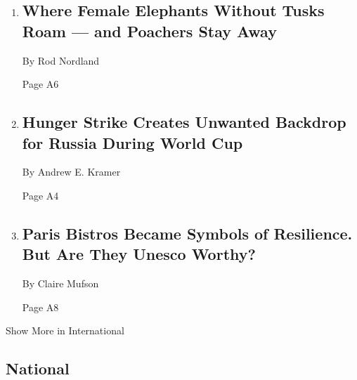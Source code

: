 \begin{enumerate}
\def\labelenumi{\arabic{enumi}.}
\item
  \href{/2018/06/16/world/africa/south-africa-elephants-tusks.html}{}

  \hypertarget{where-female-elephants-without-tusks-roam--and-poachers-stay-away-1}{%
  \subsection{Where Female Elephants Without Tusks Roam --- and Poachers
  Stay
  Away}\label{where-female-elephants-without-tusks-roam--and-poachers-stay-away-1}}

  By Rod Nordland

  Page A6
\item
  \href{/2018/06/16/world/europe/sentsov-russia-hunger-strike-world-cup.html}{}

  \hypertarget{hunger-strike-creates-unwanted-backdrop-for-russia-during-world-cup}{%
  \subsection{Hunger Strike Creates Unwanted Backdrop for Russia During
  World
  Cup}\label{hunger-strike-creates-unwanted-backdrop-for-russia-during-world-cup}}

  By Andrew E. Kramer

  Page A4
\item
  \href{/2018/06/16/world/europe/paris-bistro-cafe-unesco.html}{}

  \hypertarget{paris-bistros-became-symbols-of-resilience-but-are-they-unesco-worthy}{%
  \subsection{Paris Bistros Became Symbols of Resilience. But Are They
  Unesco
  Worthy?}\label{paris-bistros-became-symbols-of-resilience-but-are-they-unesco-worthy}}

  By Claire Mufson

  Page A8
\end{enumerate}

Show More in International

\hypertarget{national}{%
\subsection{National}\label{national}}

